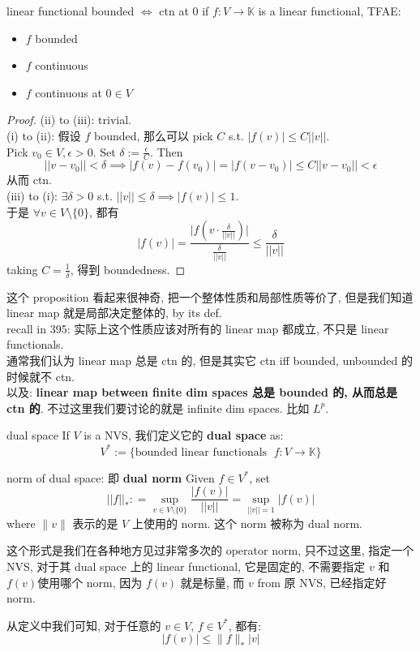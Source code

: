 \documentclass[lang=cn,11pt]{elegantbook}
\begin{document}
\begin{proposition}{linear functional bounded $\iff$ ctn at $0$}
    if $f:V\to \mathbb{K}$ is a linear functional, TFAE:
    \begin{itemize}
        \item $f$ bounded
        \item $f$ continuous
        \item $f$ continuous at $0\in V$
    \end{itemize}
\end{proposition}
\begin{proof}
    (ii) to (iii): trivial.\\
    (i) to (ii): 假设 $f$ bounded, 那么可以 pick $C$ s.t. $|f(v)| \leq C||v||$.\\
    Pick $v_0\in V, \epsilon > 0$. Set $\delta := \frac{\epsilon}{C}$. Then
\[
    ||v-v_0|| <\delta \implies |f(v)-f(v_0)| = |f(v-v_0)| \leq C||v-v_0|| < \epsilon
    \]
   从而 ctn.\\
    (iii) to (i): $\exists \delta > 0$ s.t. $||v|| \leq \delta\implies |f(v)|\leq 1$.\\
    于是 $\forall v \in V\setminus \{0\}$, 都有 \[
    |f(v)| =   \frac{\big|f(v \cdot \frac{\delta}{||v||} ) \big| }{\frac{\delta}{||v||}}   \leq \frac{\delta}{||v||}
    \] taking $C =\frac{1}{\delta}$, 得到 boundedness.
\end{proof}
\begin{remark}
    这个 proposition 看起来很神奇, 把一个整体性质和局部性质等价了, 但是我们知道 linear map 就是局部决定整体的, by its def.\\
 recall in 395: 实际上这个性质应该对所有的 linear map 都成立, 不只是 linear functionals. \\
 通常我们认为 linear map 总是 ctn 的, 但是其实它 ctn iff bounded, unbounded 的时候就不 ctn.\\
 以及: \textbf{linear map between finite dim spaces 总是 bounded 的, 从而总是 ctn 的}. 不过这里我们要讨论的就是 infinite dim spaces. 比如 $L^p$.
\end{remark}


\begin{definition}{dual space}
If $V$ is a NVS, 我们定义它的 \textbf{dual space} as: \[
    V^* := \{\text{bounded linear functionals }\; f: V \to \mathbb{K}  \}
    \]
\end{definition}



\begin{definition}{norm of dual space: 即 \textbf{dual norm}}
    Given $f \in V^*$, set \[
    ||f||_* : = \sup_{v\in V\setminus \{0\}} \frac{|f(v)|}{||v||} = \sup_{||v||=1} |f(v)|
    \]
  where $\| v\|$ 表示的是 $V$ 上使用的 norm. 这个 norm 被称为 dual norm.
    \end{definition}
        这个形式是我们在各种地方见过非常多次的\textbf{ }operator norm, 只不过这里, 指定一个 NVS, 对于其 dual space 上的 linear functional, 它是固定的, 不需要指定 $v$ 和 $f(v)$使用哪个 norm, 因为 $f(v)$ 就是标量, 而 $v$ from 原  NVS, 已经指定好 norm. 
\begin{remark}
    从定义中我们可知, 对于任意的 $v\in V$, $f\in V^*$, 都有: \[
    |f(v)| \leq \|f \|_*|v|
    \]
\end{remark}
        
\end{document}
